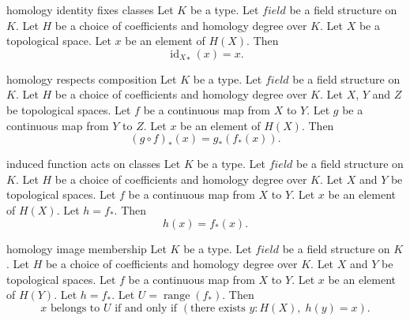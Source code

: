 \begin{cleanresult}{homology identity fixes classes}
Let $K$ be a type.
Let $\mathit{field}$ be a field structure on $K$.
Let $H$ be a choice of coefficients and homology degree over $K$.
Let $X$ be a topological space.
Let $x$ be an element of $H(X)$.
Then \[{\operatorname{id}_{X}}_*(x)=x.\]
\par{}
\end{cleanresult}

\begin{cleanresult}{homology respects composition}
Let $K$ be a type.
Let $\mathit{field}$ be a field structure on $K$.
Let $H$ be a choice of coefficients and homology degree over $K$.
Let $X$, $Y$ and $Z$ be topological spaces.
Let $f$ be a continuous map from $X$ to $Y$.
Let $g$ be a continuous map from $Y$ to $Z$.
Let $x$ be an element of $H(X)$.
Then \[{\left(g \circ f\right)}_*(x)={g}_*({f}_*(x)).\]
\par{}
\end{cleanresult}

\begin{cleanresult}{induced function acts on classes}
Let $K$ be a type.
Let $\mathit{field}$ be a field structure on $K$.
Let $H$ be a choice of coefficients and homology degree over $K$.
Let $X$ and $Y$ be topological spaces.
Let $f$ be a continuous map from $X$ to $Y$.
Let $x$ be an element of $H(X)$.
Let $h = {f}_*$.
Then \[h(x)={f}_*(x).\]
\end{cleanresult}

\begin{cleanresult}{homology image membership}
Let $K$ be a type.
Let $\mathit{field}$ be a field structure on $K$.
Let $H$ be a choice of coefficients and homology degree over $K$.
Let $X$ and $Y$ be topological spaces.
Let $f$ be a continuous map from $X$ to $Y$.
Let $x$ be an element of $H(Y)$.
Let $h = {f}_*$.
Let $U = \operatorname{range}({f}_*)$.
Then \[x\text{ belongs to }U\text{ if and only if }\left(\text{there exists }y : H(X),\; h(y)=x\right).\]
\par{}
\end{cleanresult}

